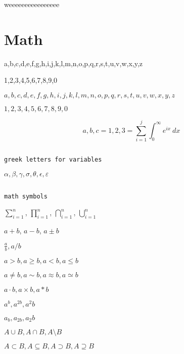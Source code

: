 \documentclass[11pt, oneside]{article}   	%
\begin{document}
\hspace{-1.5in} weeeeeeeeeeeeeeee



\newpage



\section{Math} \noindent

a,b,c,d,e,f,g,h,i,j,k,l,m,n,o,p,q,r,s,t,u,v,w,x,y,z

1,2,3,4,5,6,7,8,9,0

$a,b,c,d,e,f,g,h,i,j,k,l,m,n,o,p,q,r,s,t,u,v,w,x,y,z$

$1,2,3,4,5,6,7,8,9,0$ %

\[ a,b,c = 1,2,3 = \sum_{i=1}^j \int_0^{\infty} e^{ix} \ dx \]

$\ $ %

\texttt{greek letters for variables}

$\alpha, \beta, \gamma, \sigma, \theta, \epsilon, \varepsilon$

$\ $

\texttt{math symbols}

$\sum_{i=1}^n$, $\prod_{i=1}^n$, $\bigcap_{i=1}^n$, $\bigcup_{i=1}^n$

$a+b$, $a-b$, $a \pm b$

$\frac{a}{b}, a/b$

$a > b, a \geq b, a < b, a \leq b$

$a \ne b, a \sim b, a \approx b, a \simeq b$

$a \cdot b, a \times b, a * b$

$a^b, a^{2b}, a^2b$

$a_b, a_{2b}, a_2b$ 

$A \cup B, A \cap B, A \setminus B$

$A \subset B, A \subseteq B, A \supset B, A \supseteq B$
\end{document}
